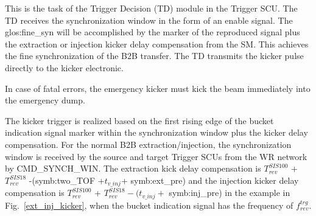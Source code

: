 This is the task of the Trigger Decision (TD) module in the Trigger SCU. The TD receives the synchronization window in the form of an enable signal. The \gls{glos:fine_syn} will be accomplished by the marker of the reproduced signal plus the extraction or injection kicker delay compensation from the SM. This achieves the fine synchronization of the B2B transfer. The TD transmits the kicker pulse directly to the kicker electronic.  
 
In case of fatal errors, the emergency kicker must kick the beam immediately into the emergency dump.

%

The kicker trigger is realized based on the first rising edge of the bucket indication signal marker within the synchronization window plus the kicker delay compensation. For the normal B2B extraction/injection, the synchronization window is received by the source and target Trigger SCUs from the WR network by CMD\_SYNCH\_WIN. The extraction kick delay compensation is $T_{\mathit{rev}}^{\mathit{SIS100}}$ + $T_{\mathit{rev}}^{\mathit{SIS18}}$ -(\gls{symb:two_TOF} +$ t_{v\_inj}$+ \gls{symb:ext_pre}) and the injection kicker delay compensation is $T_{\mathit{rev}}^{\mathit{SIS100}}$ + $T_{\mathit{rev}}^{\mathit{SIS18}} - (t_{v\_inj}+$ \gls{symb:inj_pre}) in the example in Fig.~\ref{ext_inj_kicker}, when the bucket indication signal has the frequency of $f_{\mathit{rev}}^{\mathit{trg}}$. 

